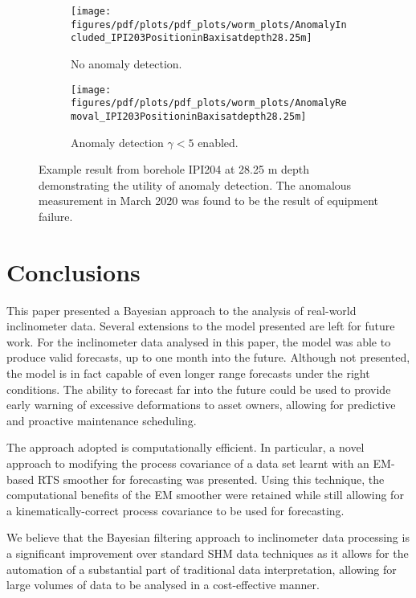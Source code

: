 \documentclass[pamm,a4paper,fleqn]{w-art}
\begin{document}
\begin{figure}[b]
  \centering
  \begin{subfigure}{.5\textwidth}
    \centering
    \texttt{[image: figures/pdf/plots/pdf\_plots/worm\_plots/AnomalyIncluded\_IPI203PositioninBaxisatdepth28.25m]}
    \caption{No anomaly detection.}
    \label{fig:sub1noanomaly}
  \end{subfigure}%
  \begin{subfigure}{.5\textwidth}
    \centering
    \texttt{[image: figures/pdf/plots/pdf\_plots/worm\_plots/AnomalyRemoval\_IPI203PositioninBaxisatdepth28.25m]}
    \caption{Anomaly detection $\gamma < 5$ enabled.}
    \label{fig:sub2yesanomaly}
  \end{subfigure}
  \caption{Example result from borehole IPI204 at 28.25 m depth demonstrating the utility of anomaly detection. The anomalous measurement in March 2020 was found to be the result of equipment failure.}
  \label{fig:anomalydetection}
\end{figure}
  




\section{Conclusions}


This paper presented a Bayesian approach to the analysis of real-world inclinometer data. Several extensions to the model presented are left for future work. For the inclinometer data analysed in this paper, the model was able to produce valid forecasts, up to one month into the future. Although not presented, the model is in fact capable of even longer range forecasts under the right conditions. The ability to forecast far into the future could be used to provide early warning of excessive deformations to asset owners, allowing for predictive and proactive maintenance scheduling.

The approach adopted is computationally efficient. In particular, a novel approach to modifying the process covariance of a data set learnt with an EM-based RTS smoother for forecasting was presented. Using this technique, the computational benefits of the EM smoother were retained while still allowing for a kinematically-correct process covariance to be used for forecasting. 

We believe that the Bayesian filtering approach to inclinometer data processing is a significant improvement over standard SHM data techniques as it allows for the automation of a substantial part of traditional data interpretation, allowing for large volumes of data to be analysed in a cost-effective manner.

\vspace{\baselineskip}


\end{document}
